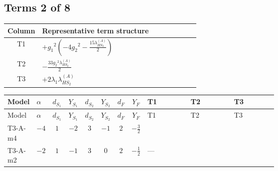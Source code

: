 \documentclass[8pt]{article}
\begin{document}
\begin{landscape}
\subsection*{Terms 2 of 8}
\begin{center}
\begin{tabular}{@{}c >{\raggedright\arraybackslash}p{0.82\linewidth}@{}}
\toprule
Column & Representative term structure \\
\midrule
T1 & \(\displaystyle +{g_1}^2 \left(-4 {g_2}^2-\frac{15 {\lambda_{HS_2}^{(A)}}}{2}\right)\) \\
\midrule
T2 & \(\displaystyle -\frac{33 {g_2}^2 {\lambda_{HS_2}^{(A)}}}{2}\) \\
\midrule
T3 & \(\displaystyle +2 {\lambda_1} {\lambda_{HS_2}^{(A)}}\) \\
\midrule
\bottomrule
\end{tabular}
\end{center}
\smallskip
\tiny
\begin{longtable}{@{}llcccccc >{\raggedright\arraybackslash}p{0.21\linewidth} >{\raggedright\arraybackslash}p{0.21\linewidth} >{\raggedright\arraybackslash}p{0.21\linewidth}@{}}
\toprule
Model & $\alpha$ & $d_{S_1}$ & $Y_{S_1}$ & $d_{S_2}$ & $Y_{S_2}$ & $d_F$ & $Y_F$ & T1 & T2 & T3 \\
\midrule
\endfirsthead
\toprule
Model & $\alpha$ & $d_{S_1}$ & $Y_{S_1}$ & $d_{S_2}$ & $Y_{S_2}$ & $d_F$ & $Y_F$ & T1 & T2 & T3 \\
\midrule
\endhead
T3-A-m4 & $-4$ & $1$ & $-2$ & $3$ & $-1$ & $2$ & $-\frac{3}{2}$ & \scriptsize\adjustbox{max width=\linewidth}{$\begin{gathered} +{g_1}^2 \left(-4 {g_2}^2-\frac{15 {\lambda_{HS_2}^{(A)}}}{2}\right)\end{gathered}$} & \scriptsize\adjustbox{max width=\linewidth}{$\begin{gathered} -\frac{33 {g_2}^2 {\lambda_{HS_2}^{(A)}}}{2}\end{gathered}$} & \scriptsize\adjustbox{max width=\linewidth}{$\begin{gathered} +2 {\lambda_1} {\lambda_{HS_2}^{(A)}}\end{gathered}$} \\
\midrule
T3-A-m2 & $-2$ & $1$ & $-1$ & $3$ & $0$ & $2$ & $-\frac{1}{2}$ & --- & \scriptsize\adjustbox{max width=\linewidth}{$\begin{gathered} -\frac{33 {g_2}^2 {\lambda_{HS_2}^{(A)}}}{2}\end{gathered}$} & \scriptsize\adjustbox{max width=\linewidth}{$\begin{gathered} +2 {\lambda_1} {\lambda_{HS_2}^{(A)}}\end{gathered}$} \\

\end{longtable}
\end{landscape}
\end{document}
